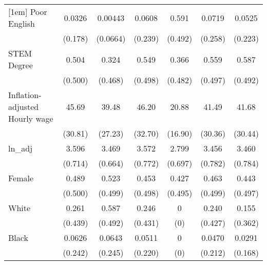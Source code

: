 \begin{table}[htbp]
\begin{tabular}{l*{6}{c}}
[1em]
Poor English        &      0.0326         &     0.00443         &      0.0608         &       0.591         &      0.0719         &      0.0525         \\
                    &     (0.178)         &    (0.0664)         &     (0.239)         &     (0.492)         &     (0.258)         &     (0.223)         \\
[1em]
STEM Degree         &       0.504         &       0.324         &       0.549         &       0.366         &       0.559         &       0.587         \\
                    &     (0.500)         &     (0.468)         &     (0.498)         &     (0.482)         &     (0.497)         &     (0.492)         \\
[1em]
Inflation-adjusted Hourly wage&       45.69         &       39.48         &       46.20         &       20.88         &       41.49         &       41.68         \\
                    &     (30.81)         &     (27.23)         &     (32.70)         &     (16.90)         &     (30.36)         &     (30.44)         \\
[1em]
ln\_adj              &       3.596         &       3.469         &       3.572         &       2.799         &       3.456         &       3.460         \\
                    &     (0.714)         &     (0.664)         &     (0.772)         &     (0.697)         &     (0.782)         &     (0.784)         \\
[1em]
Female              &       0.489         &       0.523         &       0.453         &       0.427         &       0.463         &       0.443         \\
                    &     (0.500)         &     (0.499)         &     (0.498)         &     (0.495)         &     (0.499)         &     (0.497)         \\
[1em]
White               &       0.261         &       0.587         &       0.246         &           0         &       0.240         &       0.155         \\
                    &     (0.439)         &     (0.492)         &     (0.431)         &         (0)         &     (0.427)         &     (0.362)         \\
[1em]
Black               &      0.0626         &      0.0643         &      0.0511         &           0         &      0.0470         &      0.0291         \\
                    &     (0.242)         &     (0.245)         &     (0.220)         &         (0)         &     (0.212)         &     (0.168)         \\

\end{tabular}
\end{table}
